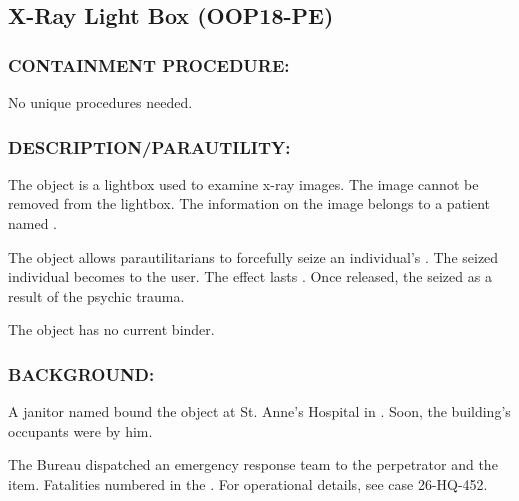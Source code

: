 \subsection*{X-Ray Light Box (OOP18-PE)}
\subsubsection*{CONTAINMENT PROCEDURE:}
\par No unique procedures needed.
\subsubsection*{DESCRIPTION/PARAUTILITY:}
\par The object is a lightbox used to examine
x-ray images. The image cannot be
removed from the lightbox. The
information on the image belongs to a
patient named .
\par The object allows parautilitarians to forcefully seize an individual's . The seized individual becomes  to the user. The effect lasts . Once
released, the seized  as a result of the psychic trauma.
\par The object has no current binder.
\subsubsection*{BACKGROUND:}
\par A janitor named  bound the object at St. Anne's Hospital in . Soon, the building's occupants were  by him.
\par The Bureau dispatched an emergency response team to 
the perpetrator and  the item. Fatalities numbered in the . For operational details, see case 26-HQ-452.